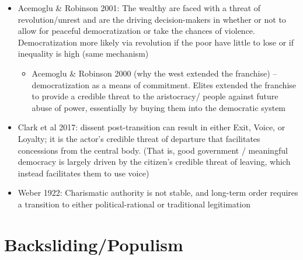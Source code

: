 \documentclass[12pt]{article}
\begin{document}
\begin{itemize}
    \item Acemoglu \& Robinson 2001: The wealthy are faced with a threat of revolution/unrest and are the driving decision-makers in whether or not to allow for peaceful democratization or take the chances of violence. Democratization more likely via revolution if the poor have little to lose or if inequality is high (same mechanism)
    \begin{itemize}
        \item Acemoglu \& Robinson 2000 (why the west extended the franchise) -- democratization as a means of commitment. Elites extended the franchise to provide a credible threat to the aristocracy/ people against future abuse of power, essentially by buying them into the democratic system
    \end{itemize}
    \item Clark et al 2017: dissent post-transition can result in either Exit, Voice, or Loyalty; it is the actor's credible threat of departure that facilitates concessions from the central body. (That is, good government / meaningful democracy is largely driven by the citizen's credible threat of leaving, which instead facilitates them to use voice)
    \item Weber 1922: Charismatic authority is not stable, and long-term order requires a transition to either political-rational or traditional legitimation
\end{itemize}





\section*{Backsliding/Populism}
\end{document}
